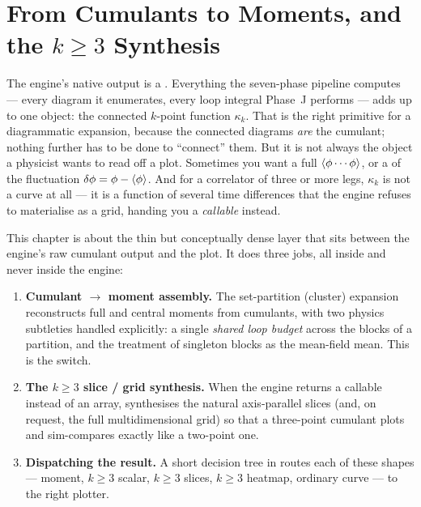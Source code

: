 \chapter{From Cumulants to Moments, and the \texorpdfstring{$k\!\ge\!3$}{k>=3} Synthesis}\label{ch:cumulants-moments}

The engine's native output is a . Everything the
seven-phase pipeline computes --- every diagram it enumerates, every loop
integral Phase~J performs --- adds up to one object: the connected $k$-point
function $\kappa_k$. That is the right primitive for a diagrammatic expansion,
because the connected diagrams \emph{are} the cumulant; nothing further has to be
done to ``connect'' them. But it is not always the object a physicist wants to
read off a plot. Sometimes you want a full  $\left\langle \phi\cdots\phi \right\rangle$,
or a  of the fluctuation $\delta\phi = \phi - \left\langle \phi \right\rangle$.
And for a correlator of three or more legs, $\kappa_k$ is not a curve at all ---
it is a function of several time differences that the engine refuses to
materialise as a grid, handing you a \emph{callable} instead.

This chapter is about the thin but conceptually dense layer that sits between the
engine's raw cumulant output and the plot. It does three jobs, all inside
 and never inside the engine:

\begin{enumerate}
  \item \textbf{Cumulant $\to$ moment assembly.} The set-partition (cluster)
        expansion reconstructs full and central moments from cumulants, with two
        physics subtleties handled explicitly: a single \emph{shared loop budget}
        across the blocks of a partition, and the treatment of singleton blocks
        as the mean-field mean. This is the  switch.
  \item \textbf{The $k\!\ge\!3$ slice / grid synthesis.} When the engine returns
        a callable instead of an array,  synthesises the natural
        axis-parallel slices (and, on request, the full multidimensional grid) so
        that a three-point cumulant plots and sim-compares exactly like a
        two-point one.
  \item \textbf{Dispatching the result.} A short decision tree in
         routes each of these shapes --- moment, $k\!\ge\!3$
        scalar, $k\!\ge\!3$ slices, $k\!\ge\!3$ heatmap, ordinary curve --- to the
        right plotter.
\end{enumerate}


